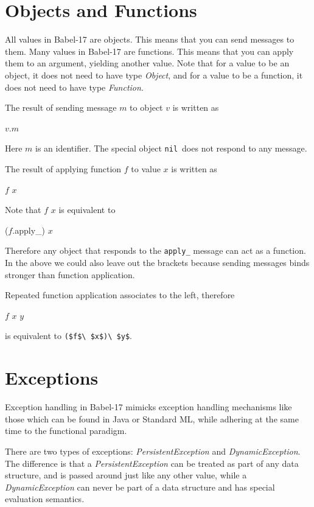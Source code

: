 \documentclass[11pt]{amsart}
\newcommand{\metababel}[1] {\textsl{#1}}
\newcommand{\babelsrc}[1] {\lstinline!#1!}
\begin{document}
\section{Objects and Functions}
All values in Babel-17 are objects. This means that you can send messages to them. Many values in Babel-17 are functions. This means that you can apply them to an argument, yielding another value. Note that for a value to be an object, it does not need to have type \metababel{Object}, and for a value to be a function,  it does not need to have type \metababel{Function}. 

The result of sending message $m$ to object $v$  is written as
\begin{babellisting}
$v$.$m$
\end{babellisting}
Here $m$ is an identifier. The special object \babelsrc{nil}\ does not respond to any message.

The result of applying function $f$ to value $x$ is written as 
\begin{babellisting}
$f$ $x$
\end{babellisting}
Note that $f$ $x$ is equivalent to 
\begin{babellisting}
($f$.apply_) $x$
\end{babellisting}
Therefore any object that responds to the \babelsrc{apply_} message can act as a function.
In the above we could also leave out the brackets because sending messages binds stronger than function application. 

Repeated function application associates to the left, therefore 
\begin{babellisting}
$f$ $x$ $y$ 
\end{babellisting} 
is equivalent to \babelsrc{($f$\ $x$)\ $y$}.

\section{Exceptions}
Exception handling in Babel-17 mimicks exception handling mechanisms like those which can be found in Java or Standard ML, while adhering at the same time to the functional paradigm.

There are two types of exceptions: \metababel{PersistentException} and  \metababel{DynamicException}.
The difference is that a \metababel{PersistentException}  can be treated as part of any data structure, and is passed around just like any other value, while a \metababel{DynamicException} can never be part of a data structure and has special evaluation semantics. 
\end{document}
